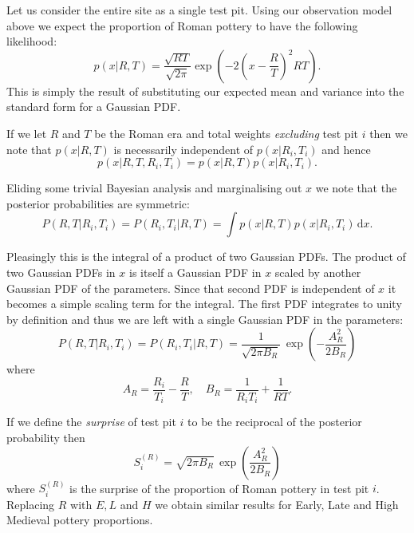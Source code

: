 \documentclass[a4paper]{paper}
\begin{document}
Let us consider the entire site as a single test pit. Using our observation
model above we expect the proportion of Roman pottery to have the following
likelihood:
\[
    p(x | R, T) = \frac{\sqrt{R T}}{\sqrt{2\pi}} \exp \left(
        - 2 \left(x - \frac{R}{T}\right)^2 R T  \right).
\]
This is simply the result of substituting our expected mean and variance into
the standard form for a Gaussian PDF.

If we let $R$ and $T$ be the Roman era and total weights \emph{excluding} test
pit $i$ then we note that $p(x | R,T)$ is necessarily independent of $p(x | R_i,
T_i)$ and hence
\[
    p(x | R, T, R_i, T_i) = p(x | R, T) p(x | R_i, T_i).
\]

Eliding some trivial Bayesian analysis and marginalising out $x$ we note that
the posterior probabilities are symmetric:
\[
    P(R,T | R_i, T_i) = P(R_i, T_i | R,T)
    = \int p(x | R, T) p(x | R_i, T_i) \, \mathrm{d}x.
\]

Pleasingly this is the integral of a product of two Gaussian PDFs. The product
of two Gaussian PDFs in $x$ is itself a Gaussian PDF in $x$ scaled by another
Gaussian PDF of the parameters. Since that second PDF is independent of $x$ it
becomes a simple scaling term for the integral. The first PDF integrates to
unity by definition and thus we are left with a single Gaussian PDF in the
parameters:
\[
    P(R,T | R_i, T_i) = P(R_i, T_i | R,T) =
    \frac{1}{\sqrt{2 \pi B_R}} \, \exp \left(
    - \frac{A_R^2}{2 B_R}
    \right)
\]
where
\[
    A_R = \frac{R_i}{T_i} - \frac{R}{T}, \quad
    B_R = \frac{1}{R_i T_i} + \frac{1}{R T}.
\]

If we define the \emph{surprise} of test pit $i$ to be the reciprocal of the
posterior probability then
\[
    S^{(R)}_i = \sqrt{2\pi B_R} \, \exp \left( \frac{A_R^2}{2B_R} \right)
\]
where $S^{(R)}_i$ is the surprise of the proportion of Roman pottery in test pit
$i$. Replacing $R$ with $E, L$ and $H$ we obtain similar results for Early, Late
and High Medieval pottery proportions.
\end{document}
